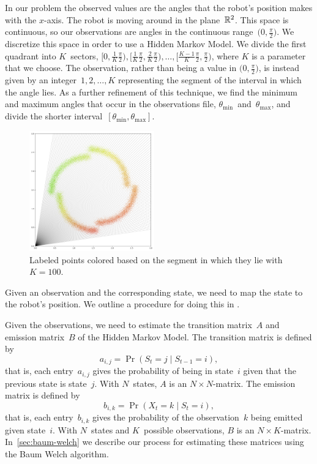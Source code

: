 \documentclass[twoside]{article}
\begin{document}
In our problem the observed values are the angles that the robot's position makes with the $x$-axis.
The robot is moving around in the plane~$\mathbb{R}^2$.
This space is continuous, so our observations are angles in the continuous range~$\big(0, \frac{\pi}{2}\big)$.
We discretize this space in order to use a Hidden Markov Model.
We divide the first quadrant into $K$~sectors, ${\textstyle \big[0, \frac{1}{K}\frac{\pi}{2}\big), \big[\frac{1}{K}\frac{\pi}{2}, \frac{2}{K}\frac{\pi}{2}\big), \ldots, \big[\frac{K - 1}{K}\frac{\pi}{2}, \frac{\pi}{2}\big)}$, where $K$ is a parameter that we choose.
The observation, rather than being a value in $\big(0, \frac{\pi}{2}\big)$, is instead given by an integer~${1, 2, \ldots, K}$ representing the segment of the interval in which the angle lies.
As a further refinement of this technique, we find the minimum and maximum angles that occur in the observations file, $\theta_{\text{min}}$~and~$\theta_{\text{max}}$, and divide the shorter interval~$[\theta_{\text{min}}, \theta_{\text{max}}]$.
\begin{figure}
  \begin{center}
    \includegraphics[width=0.48\textwidth]{images/angle-discrete}
    \caption{Labeled points colored based on the segment in which they lie with~${K = 100}$.}
  \end{center}
\end{figure}

Given an observation and the corresponding state, we need to map the state to the robot's position.
We outline a procedure for doing this in . %

Given the observations, we need to estimate the transition matrix~$A$ and emission matrix~$B$ of the Hidden Markov Model.
The transition matrix is defined by
\begin{equation*}
  a_{i,j} = \Pr(S_{t} = j \mid S_{t-1} = i),
\end{equation*}
that is, each entry~$a_{i, j}$ gives the probability of being in state~$i$ given that the previous state is state~$j$.
With $N$~states, $A$ is an ${N \times N}$-matrix.
The emission matrix is defined by
\begin{equation*}
  b_{i, k} = \Pr(X_t = k \mid S_t = i),
\end{equation*}
that is, each entry~$b_{i, k}$ gives the probability of the observation~$k$ being emitted given state~$i$.
With $N$~states and $K$~possible observations, $B$ is an ${N \times K}$-matrix.
In~\cref{sec:baum-welch} we describe our process for estimating these matrices using the Baum Welch algorithm.
\end{document}
